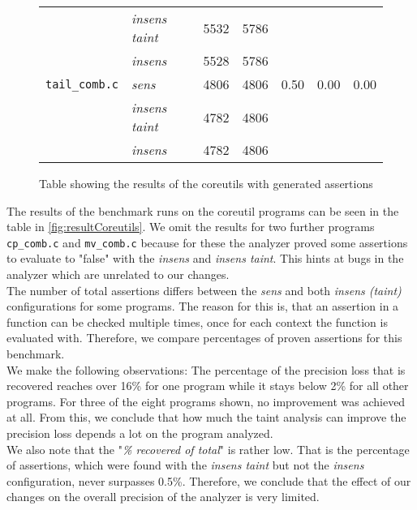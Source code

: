 \begin{figure}
\begin{tabular}{l|l||r|r||r|r|r}
          & \textit{insens taint} & 5532 & 5786 & & & \\
          & \textit{insens} & 5528 & 5786 & & & \\
          \hline         
          \texttt{tail\_comb.c} & \textit{sens} & 4806 & 4806 & 0.50 & 0.00 & 0.00\\
          & \textit{insens taint} & 4782 & 4806 & & & \\
          & \textit{insens} & 4782 & 4806 & & & \\
          \hline
        \end{tabular}
        \caption{Table showing the results of the coreutils with generated assertions}
        \label{fig:resultCoreutils}
      \end{figure}

      The results of the benchmark runs on the coreutil programs can be seen in the table in \autoref{fig:resultCoreutils}. We omit the results for two further programs \texttt{cp\_comb.c} and \texttt{mv\_comb.c} because for these the analyzer proved some assertions to evaluate to "false" with the \textit{insens} and \textit{insens taint}. This hints at bugs in the analyzer which are unrelated to our changes.\\
      The number of total assertions differs between the \textit{sens} and both \textit{insens (taint)} configurations for some programs. The reason for this is, that an assertion in a function can be checked multiple times, once for each context the function is evaluated with. Therefore, we compare percentages of proven assertions for this benchmark.\\
      We make the following observations: The percentage of the precision loss that is recovered reaches over 16\% for one program while it stays below 2\% for all other programs. For three of the eight programs shown, no improvement was achieved at all. From this, we conclude that how much the taint analysis can improve the precision loss depends a lot on the program analyzed.\\
      We also note that the "\textit{\% recovered of total}" is rather low. That is the percentage of assertions, which were found with the \textit{insens taint} but not the \textit{insens} configuration, never surpasses 0.5\%. Therefore, we conclude that the effect of our changes on the overall precision of the analyzer is very limited.      
    
